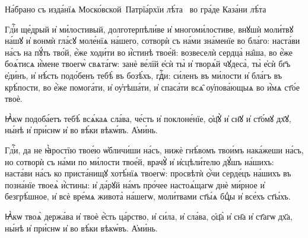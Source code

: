 \documentclass{article}          %
\makeatletter
\def\cu@lettrine{\lettrine[lines=2,findent=0pt,nindent=0pt]}
\def\cuLettrine{\cu@tokenizeletter\cu@lettrine}
\newcommand{\header}[1]{{\LARGE\centering\cuKinovar{#1}\par}}
\makeatother
\begin{document}
\begin{titlepage}
  \centering
  \Huge
  {}
  \vfill
  \Large
  На́брано съ изда́нїѧ Моско́вской~Патрїа́рхїи лѣ́та~ во гра́де Каза́ни лѣ́та~
 \date{}
\end{titlepage}

\pagestyle{cuNum}
\Large             %

\header{На вече́рни}
\vspace{2em}
\vspace{1em}

\begin{center}
\end{center}
\cuLettrine
Гдⷭ҇и ще́дрый и҆ ми́лостивый, долготерпѣли́ве и҆ многоми́лостиве, внꙋшѝ моли́твꙋ на́шꙋ и҆ вонмѝ гла́сꙋ моле́нїѧ на́шего,
сотворѝ съ на́ми зна́менїе во бла́го: наста́ви на́съ на пꙋ́ть тво́й, е҆̀же ходи́ти во и҆̀стинѣ твое́й: возвеселѝ сердца̀ на̑ша,
во е҆̀же боѧ́тисѧ и҆̀мене твоегѡ̀ свѧта́гѡ: занѐ ве́лїй е҆сѝ ты̀ и҆ творѧ́й чꙋдеса̀, ты̀ е҆сѝ бг҃ъ е҆ди́нъ, и҆ нѣ́сть подо́бенъ тебѣ̀ въ бозѣ́хъ,
гдⷭ҇и: си́ленъ въ ми́лости и҆ бла́гъ въ крѣ́пости, во е҆̀же помога́ти, и҆ оу҆тѣша́ти, и҆ спаса́ти всѧ̑ оу҆пова́ющыѧ во и҆̀мѧ ст҃о́е твоѐ.
\par
\cuKinovar Ꙗ҆̀кѡ подоба́етъ тебѣ́ всѧ́каѧ сла́ва, че́сть и҆ поклоне́нїе, ѻ҆ц҃ꙋ̀ и҆ сн҃ꙋ и҆ ст҃о́мꙋ дх҃ꙋ, ны́нѣ и҆ при́снѡ и҆ во вѣ́ки вѣкѡ́въ.
\cuKinovar А҆ми́нь.

\begin{center}
\end{center}
\cuLettrine
Гдⷭ҇и, да не ꙗ҆̀ростїю твое́ю ѡ҆бличи́ши на́съ, нижѐ гнѣ́вомъ твои́мъ нака́жеши на́съ, но сотворѝ съ на́ми по ми́лости твое́й,
врачꙋ̀ и҆ и҆сцѣли́телю дꙋ́шъ на́шихъ: наста́ви на́съ ко приста́нищꙋ хотѣ́нїѧ твоегѡ̀: просвѣтѝ ѻ҆̀чи серде́цъ на́шихъ
въ позна́нїе твоеѧ̀ и҆̀стины: и҆ да́рꙋй на́мъ про́чее настоѧ́щагѡ днѐ ми́рное и҆ безгрѣ́шное, и҆ всѐ вре́мѧ живота̀ на́шегѡ,
моли́твами ст҃ы́ѧ бцⷣы и҆ все́хъ ст҃ы́хъ.
\par
\cuKinovar Ꙗ҆̀кѡ твоѧ̀ держа́ва и҆ твоѐ е҆̀сть ца́рство, и҆ си́ла, и҆ сла́ва, ѻ҆ц҃а̀ и҆ сн҃а и҆ ст҃агѡ дх҃а, ны́нѣ и҆ при́снѡ и҆ во вѣ́ки вѣкѡ́въ.
\cuKinovar А҆ми́нь.
\end{document}
